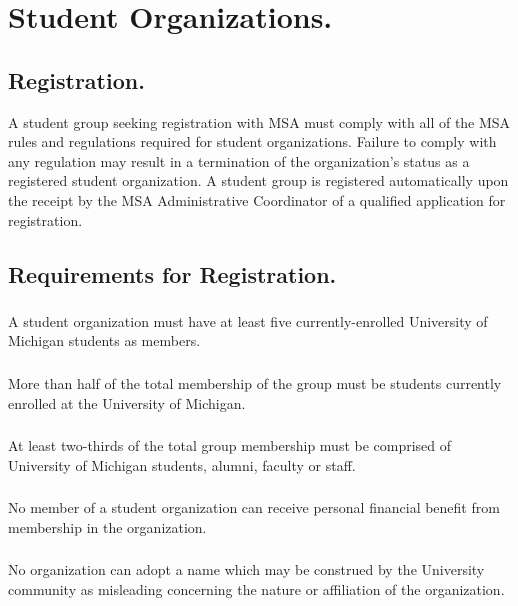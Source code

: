 \section{Student Organizations.}  

\subsection{Registration.}
A student group seeking registration with MSA must comply with all of the MSA rules and regulations required for student organizations.  Failure to comply with any regulation may result in a termination of the organization's status as a registered student organization.  A student group is registered automatically upon the receipt by the MSA Administrative Coordinator of a qualified application for registration.


\subsection{Requirements for Registration.}

\subsubsection{}
A student organization must have at least five currently-enrolled University of Michigan students as members.

\subsubsection{}
More than half of the total membership of the group must be students currently enrolled at the University of Michigan.

\subsubsection{}
At least two-thirds of the total group membership must be comprised of University of Michigan students, alumni, faculty or staff.

\subsubsection{}
No member of a student organization can receive personal financial benefit from membership in the organization.

\subsubsection{}
No organization can adopt a name which may be construed by the University community as misleading concerning the nature or affiliation of the organization.


